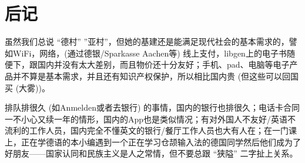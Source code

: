
\chapter*{后记}


  虽然我们总说 “德村” ”亚村”，但她的基建还是能满足现代社会的基本需求的，譬如WiFi，网络，(通过德银/Sparkasse Aachen等) 线上支付，libgen上的电子书随便下，跟国内并没有太大差别，而且物价还十分友好；手机、pad、电脑等电子产品并不算是基本需求，并且还有知识产权保护，所以相比国内贵 (但这些可以回国买 (大雾))。

  排队排很久 (如Anmelden或者去银行) 的事情，国内的银行也排很久；电话卡合同一不小心又续一年的情形，国内的App也是类似情况；有对外国人不友好/英语不流利的工作人员，国内完全不懂英文的银行/餐厅工作人员也大有人在；在一门课上，正在学德语的本小编遇到一个正在学习仓颉输入法的德国同学然后他们成为了好朋友——国家认同和民族主义是人之常情，但不要总跟 “狭隘” 二字扯上关系。
